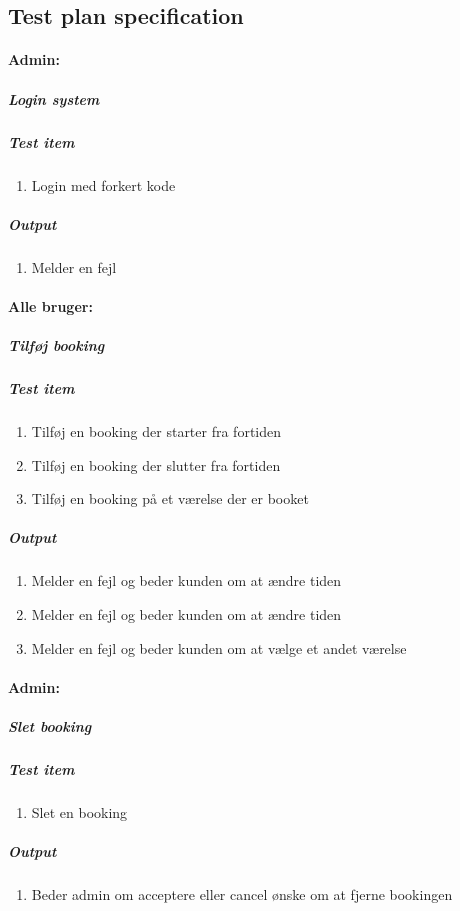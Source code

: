 \documentclass[12pt,a4paper]{article}
\begin{document}
\subsection{Test plan specification}
\paragraph{Admin:}
\subparagraph{Login system}
\subparagraph{Test item}
\begin{enumerate}
\item Login med forkert kode
\end{enumerate}
\subparagraph{Output}
\begin{enumerate}
\item Melder en fejl
\end{enumerate}
\paragraph{Alle bruger:}
\subparagraph{Tilføj booking}
\subparagraph{Test item}
\begin{enumerate}
\item Tilføj en booking der starter fra fortiden
\item Tilføj en booking der slutter fra fortiden
\item Tilføj en booking på et værelse der er booket
\end{enumerate}
\subparagraph{Output}
\begin{enumerate}
\item Melder en fejl og beder kunden om at ændre tiden
\item Melder en fejl og beder kunden om at ændre tiden
\item Melder en fejl og beder kunden om at vælge et andet værelse
\end{enumerate}
\paragraph{Admin:}
\subparagraph{Slet booking}
\subparagraph{Test item}
\begin{enumerate}
\item Slet en booking
\end{enumerate}
\subparagraph{Output}
\begin{enumerate}
\item Beder admin om acceptere eller cancel ønske om at fjerne bookingen
\end{enumerate}
\end{document}
